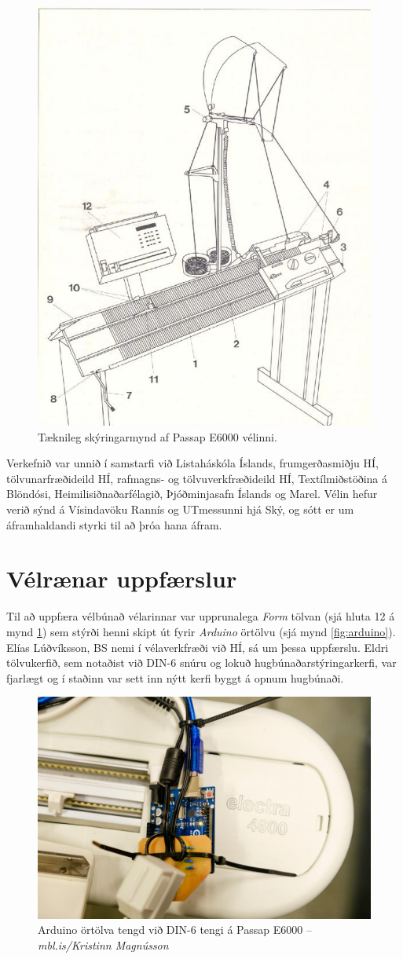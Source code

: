 \documentclass[a4paper,12pt]{article}
\begin{document}
\begin{figure}
    \centering
    \includegraphics[width=0.4\linewidth]{figs/skema-e6000.png}
    \caption{Tæknileg skýringarmynd af Passap E6000 vélinni.}
    \label{fig:skema-e6000}
\end{figure}

Verkefnið var unnið í samstarfi við Listaháskóla Íslands, frumgerðasmiðju HÍ,
tölvunarfræðideild HÍ, rafmagns- og tölvuverkfræðideild HÍ, Textílmiðstöðina á Blöndósi,
Heimilisiðnaðarfélagið, Þjóðminjasafn Íslands og Marel. Vélin hefur verið sýnd á
Vísindavöku Rannís og UTmessunni hjá Ský, og sótt er um áframhaldandi styrki til að
þróa hana áfram.

\section{Vélrænar uppfærslur}
Til að uppfæra vélbúnað vélarinnar var upprunalega \emph{Form} tölvan (sjá hluta 12 á mynd \ref{fig:skema-e6000}) sem stýrði henni
skipt út fyrir \emph{Arduino} örtölvu (sjá mynd \ref{fig:arduino}). Elías Lúðvíksson, BS nemi í vélaverkfræði við HÍ,
sá um þessa uppfærslu. Eldri tölvukerfið, sem notaðist við DIN-6 snúru og lokuð
hugbúnaðarstýringarkerfi, var fjarlægt og í staðinn var sett inn nýtt kerfi byggt á
opnum hugbúnaði.

\begin{figure}
    \centering
    \includegraphics[width=0.8\linewidth]{figs/arduino.jpg}
    \caption{Arduino örtölva tengd við DIN-6 tengi á Passap E6000 -- \textit{mbl.is/Kristinn Magnússon}}
    \label{fig:ardino}
\end{figure}
\end{document}

